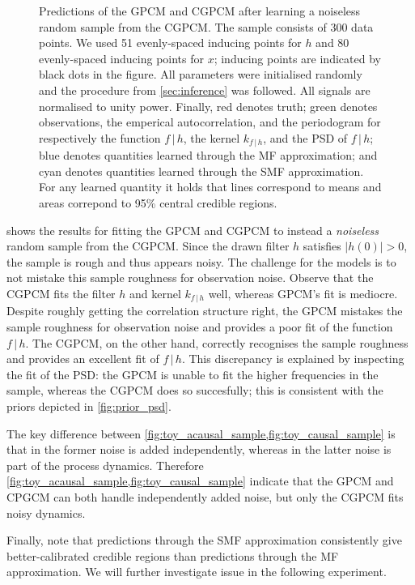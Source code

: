 \documentclass{article}
\newcommand{\cond}{\, | \,}               %
\begin{document}
\begin{figure}[t]
    \caption{Predictions of the GPCM and CGPCM after learning a noiseless random sample from the CGPCM. The sample consists of 300 data points. We used 51 evenly-spaced inducing points for $h$ and 80 evenly-spaced inducing points for $x$; inducing points are indicated by black dots in the figure. All parameters were initialised randomly and the procedure from \cref{sec:inference} was followed. All signals are normalised to unity power. Finally, {\color{red}red} denotes truth; {\color{darkgreen}green} denotes observations, the emperical autocorrelation, and the periodogram for respectively the function $f\cond h$, the kernel $k_{f\cond h}$, and the PSD of $f\cond h$; {\color{blue}blue} denotes quantities learned through the MF approximation; and {\color{mycyan}cyan} denotes quantities learned through the SMF approximation. For any learned quantity it holds that lines correspond to means and areas correpond to 95\% central credible regions.}
    \label{fig:toy_causal_sample}
\end{figure}

 shows the results for fitting the GPCM and CGPCM to instead a \textit{noiseless} random sample from the CGPCM. Since the drawn filter $h$ satisfies $|h(0)|>0$, the sample is rough and thus appears noisy. The challenge for the models is to not mistake this sample roughness for observation noise. Observe that the CGPCM fits the filter $h$ and kernel $k_{f \cond h}$ well, whereas GPCM's fit is mediocre. Despite roughly getting the correlation structure right, the GPCM mistakes the sample roughness for observation noise and provides a poor fit of the function $f\cond h$. The CGPCM, on the other hand, correctly recognises the sample roughness and provides an excellent fit of $f \cond h$. This discrepancy is explained by inspecting the fit of the PSD: the GPCM is unable to fit the higher frequencies in the sample, whereas the CGPCM does so succesfully; this is consistent with the priors depicted in \cref{fig:prior_psd}.

The key difference between \cref{fig:toy_acausal_sample,fig:toy_causal_sample} is that in the former noise is added independently, whereas in the latter noise is part of the process dynamics. Therefore \cref{fig:toy_acausal_sample,fig:toy_causal_sample} indicate that the GPCM and CPGCM can both handle independently added noise, but only the CGPCM fits noisy dynamics.

Finally, note that predictions through the SMF approximation consistently give better-calibrated credible regions than predictions through the MF approximation. We will further investigate issue in the following experiment.
\end{document}
